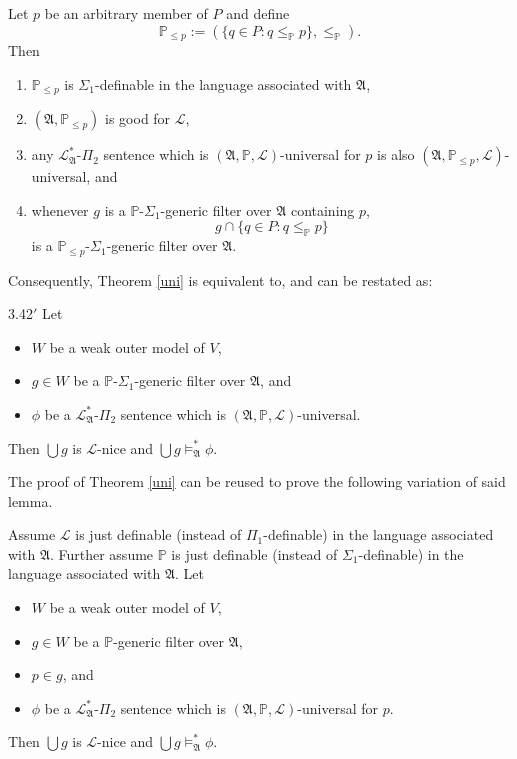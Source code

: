 \documentclass[12pt]{article}
\numberwithin{equation}{section}
\begin{document}
\begin{rem}\label{endremmain}
Let $p$ be an arbitrary member of $P$ and define $$\mathbb{P}_{\leq p} := (\{q \in P : q \leq_{\mathbb{P}} p\}, \leq_{\mathbb{P}}).$$ Then 
\begin{enumerate}[label=(\arabic*)]
    \item $\mathbb{P}_{\leq p}$ is $\Sigma_1$-definable in the language associated with $\mathfrak{A}$, 
    \item $(\mathfrak{A}, \mathbb{P}_{\leq p})$ is good for $\mathcal{L}$, 
    \item any $\mathcal{L}^{*}_{\mathfrak{A}}$-$\Pi_2$ sentence which is $(\mathfrak{A}, \mathbb{P}, \mathcal{L})$-universal for $p$ is also $(\mathfrak{A}, \mathbb{P}_{\leq p}, \mathcal{L})$-universal, and
    \item whenever $g$ is a $\mathbb{P}$-$\Sigma_1$-generic filter over $\mathfrak{A}$ containing $p$, $$g \cap \{q \in P : q \leq_{\mathbb{P}} p\}$$ is a $\mathbb{P}_{\leq p}$-$\Sigma_1$-generic filter over $\mathfrak{A}$.
\end{enumerate}
Consequently, Theorem \ref{uni} is equivalent to, and can be restated as:
\end{rem}

\begin{customlem}{3.42$'$}\label{lem329p}
Let 
\begin{itemize} 
    \item $W$ be a weak outer model of $V$,
    \item $g \in W$ be a $\mathbb{P}$-$\Sigma_1$-generic filter over $\mathfrak{A}$, and
    \item $\phi$ be a $\mathcal{L}^{*}_{\mathfrak{A}}$-$\Pi_2$ sentence which is $(\mathfrak{A}, \mathbb{P}, \mathcal{L})$-universal.
\end{itemize} 
Then $\bigcup g$ is $\mathcal{L}$-nice and $\bigcup g \models^{*}_{\mathfrak{A}} \phi$.
\end{customlem}

\begin{rem}\label{rem331}
The proof of Theorem \ref{uni} can be reused to prove the following variation of said lemma.
\end{rem}

\begin{lem}\label{lem332}
Assume $\mathcal{L}$ is just definable (instead of $\Pi_1$-definable) in the language associated with $\mathfrak{A}$. Further assume $\mathbb{P}$ is just definable (instead of $\Sigma_1$-definable) in the language associated with $\mathfrak{A}$. Let 
\begin{itemize} 
    \item $W$ be a weak outer model of $V$,
    \item $g \in W$ be a $\mathbb{P}$-generic filter over $\mathfrak{A}$, 
    \item $p \in g$, and
    \item $\phi$ be a $\mathcal{L}^{*}_{\mathfrak{A}}$-$\Pi_2$ sentence which is $(\mathfrak{A}, \mathbb{P}, \mathcal{L})$-universal for $p$.
\end{itemize} 
Then $\bigcup g$ is $\mathcal{L}$-nice and $\bigcup g \models^{*}_{\mathfrak{A}} \phi$.
\end{lem}
\end{document}
